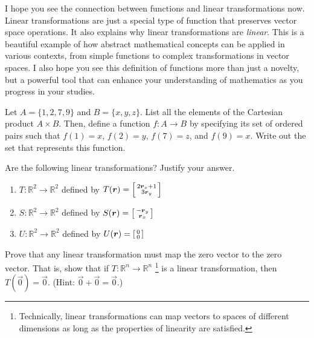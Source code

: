 I hope you see the connection between functions and linear transformations now. Linear transformations are just a special type of function that preserves vector space operations. It also explains why linear transformations are \textit{linear}. This is a beautiful example of how abstract mathematical concepts can be applied in various contexts, from simple functions to complex transformations in vector spaces. I also hope you see this definition of functions more than just a novelty, but a powerful tool that can enhance your understanding of mathematics as you progress in your studies.
\begin{problem}[1]
  Let \(A = \{1, 2, 7, 9\}\) and \(B = \{x, y, z\}\). List all the elements of the Cartesian product \(A \times B\). Then, define a function \(f: A \to B\) by specifying its set of ordered pairs such that \(f(1)=x\), \(f(2)=y\), \(f(7)=z\), and \(f(9)=x\). Write out the set that represents this function.
\end{problem}
\begin{problem}[1]
  Are the following linear transformations? Justify your answer.
  \begin{enumerate}[label=\alph*)]
    \item \(T: \mathbb{R}^2 \to \mathbb{R}^2\) defined by \(T(\vec{r}) = \begin{bsmallmatrix}
      2\vec{r}_x + 1 \\
      3\vec{r}_y
    \end{bsmallmatrix}\)
    \item \(S: \mathbb{R}^2 \to \mathbb{R}^2\) defined by \(S(\vec{r}) = \begin{bsmallmatrix}
      -\vec{r}_y \\
      \vec{r}_x
    \end{bsmallmatrix}\)
    \item \(U: \mathbb{R}^2 \to \mathbb{R}^2\) defined by \(U(\vec{r}) = \begin{bsmallmatrix}
      0 \\
      0
    \end{bsmallmatrix}\)
  \end{enumerate}
\end{problem}
\begin{problem}[2]
  Prove that any linear transformation must map the zero vector to the zero vector. That is, show that if \(T: \mathbb{R}^n \to \mathbb{R}^n\) \footnote{Technically, linear transformations can map vectors to spaces of different dimensions as long as the properties of linearity are satisfied.} is a linear transformation, then \(T(\vec{0}) = \vec{0}\). (Hint: \(\vec{0}+\vec{0}=\vec{0}\).)
\end{problem}
